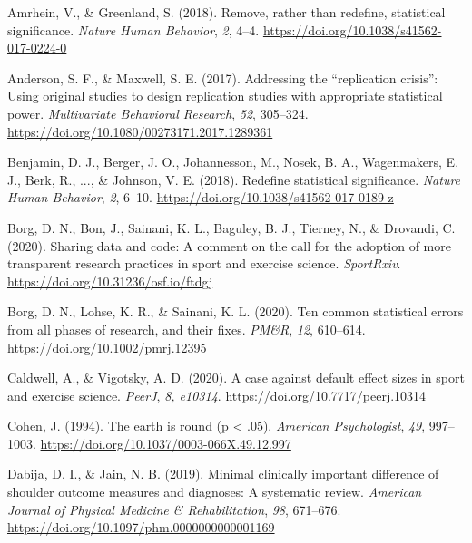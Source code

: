 \documentclass[]{cik}%
\newlength{\cslhangindent}
\newlength{\cslentryspacingunit} %
\newenvironment{CSLReferences}[2] %
 {%
  \setlength{\parindent}{0pt}
  \ifodd #1
  \let\oldpar\par
  \def\par{\hangindent=\cslhangindent\oldpar}
  \fi
  \setlength{\parskip}{#2\cslentryspacingunit}
 }%
 {}
\begin{document}
\hypertarget{refs}{}
\begin{CSLReferences}{1}{0}
\leavevmode{}%
Amrhein, V., \& Greenland, S. (2018). Remove, rather than redefine,
statistical significance. \emph{Nature Human Behavior}, \emph{2}, 4--4.
\url{https://doi.org/10.1038/s41562-017-0224-0}

\leavevmode{}%
Anderson, S. F., \& Maxwell, S. E. (2017). Addressing the {``replication
crisis''}: Using original studies to design replication studies with
appropriate statistical power. \emph{Multivariate Behavioral Research},
\emph{52}, 305--324. \url{https://doi.org/10.1080/00273171.2017.1289361}

\leavevmode{}%
Benjamin, D. J., Berger, J. O., Johannesson, M., Nosek, B. A.,
Wagenmakers, E. J., Berk, R., ..., \& Johnson, V. E. (2018). Redefine
statistical significance. \emph{Nature Human Behavior}, \emph{2}, 6--10.
\url{https://doi.org/10.1038/s41562-017-0189-z}

\leavevmode{}%
Borg, D. N., Bon, J., Sainani, K. L., Baguley, B. J., Tierney, N., \&
Drovandi, C. (2020). Sharing data and code: A comment on the call for
the adoption of more transparent research practices in sport and
exercise science. \emph{SportRxiv}.
\url{https://doi.org/10.31236/osf.io/ftdgj}

\leavevmode{}%
Borg, D. N., Lohse, K. R., \& Sainani, K. L. (2020). Ten common
statistical errors from all phases of research, and their fixes.
\emph{PM\&R}, \emph{12}, 610--614.
\url{https://doi.org/10.1002/pmrj.12395}

\leavevmode{}%
Caldwell, A., \& Vigotsky, A. D. (2020). A case against default effect
sizes in sport and exercise science. \emph{PeerJ}, \emph{8, e10314}.
\url{https://doi.org/10.7717/peerj.10314}

\leavevmode{}%
Cohen, J. (1994). The earth is round (p \textless{} .05). \emph{American
Psychologist}, \emph{49}, 997--1003.
\url{https://doi.org/10.1037/0003-066X.49.12.997}

\leavevmode{}%
Dabija, D. I., \& Jain, N. B. (2019). Minimal clinically important
difference of shoulder outcome measures and diagnoses: A systematic
review. \emph{American Journal of Physical Medicine \& Rehabilitation},
\emph{98}, 671--676. \url{https://doi.org/10.1097/phm.0000000000001169}


\end{CSLReferences}
\end{document}
